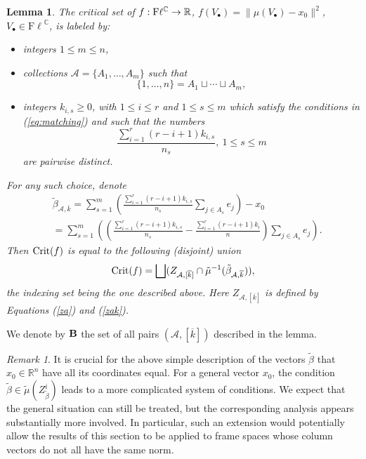\documentclass[12pt]{amsart}
\newtheorem{lem}[thm]{Lemma}
\theoremstyle{definition}
\theoremstyle{remark}
\newtheorem{rem}[thm]{Remark}
\newcommand{\RR}{\mathbb R}
\newcommand{\CC}{\mathbb C}
\newcommand{\vk}{\overline{k}}
\newcommand{\A}{{\mathcal A}}
\newcommand{\Fl}{{\mathrm{F\ell}}}
\begin{document}
\begin{lem}\label{critset}
 The critical set of   $f  : {\rm F}\ell^\CC \to \RR$, $f(V_\bullet) = \|\mu(V_\bullet)-x_0\|^2$, $V_\bullet \in \Fl^\CC$,   is labeled by:
 \begin{itemize}
 \item integers
 $1\le m \le n$,
 \item collections ${\mathcal A}=\{A_1, \ldots, A_m\}$ such that
 $$\{1, \ldots,n\} = A_1 \sqcup \cdots \sqcup A_m,$$
\item integers $k_{i,s}\ge 0$, with $1\le i \le r$ and $1\le s\le m$  which satisfy the conditions in (\ref{eq:matching}) 
 and such that the numbers 
 $$\frac{\sum_{i=1}^r(r-i+1) k_{i, s}}{n_s}, \ 1\le s \le m$$
  are pairwise distinct.
 \end{itemize} 
 For any such choice, denote
\begin{align}\label{betatil} {}& \tilde{\beta}_{{\mathcal A},\overline{k}} = \sum_{s=1}^m\left(\frac{\sum_{i=1}^r(r-i+1) k_{i, s}}{n_s}\sum_{j\in A_s} e_j \right)-x_0\\ \nonumber
{}& = \sum_{s=1}^m\left(\left(\frac{\sum_{i=1}^r(r-i+1)k_{i, s}}{n_s}-\frac{\sum_{i=1}^r {(r-i+1)k_i}}{n}\right)\sum_{j\in A_s} e_j \right).\end{align}
Then ${\rm Crit}(f)$ is equal to the following (disjoint) union%
$${\rm Crit}(f)= \bigsqcup (Z_{{\A,[\overline{k}]}} \cap \tilde{\mu}^{-1}(\tilde{\beta}_{\A,\overline{k}})),$$
the indexing set being the one described above. Here $Z_{{\A,[\overline{k}]}}$ is defined by Equations (\ref{za}) and (\ref{zak}).
 \end{lem} 

We denote by ${\bf B}$ the set of  all pairs $({\A, [\vk]})$ described in the lemma. 

\begin{rem} It is crucial for the above simple description of the vectors $\tilde{\beta}$  that $x_0\in \RR^n$ have all its coordinates equal. For a general vector $x_0$, the condition
$\tilde\beta\in\tilde\mu(Z_{\tilde\beta}^i)$
leads to a more complicated system of conditions. We expect that the general situation can still be treated, but the corresponding analysis appears substantially more involved. In particular, such an extension would potentially allow the results of this section to be applied to frame spaces whose column vectors do not all have the same norm.
\end{rem}
\end{document}

